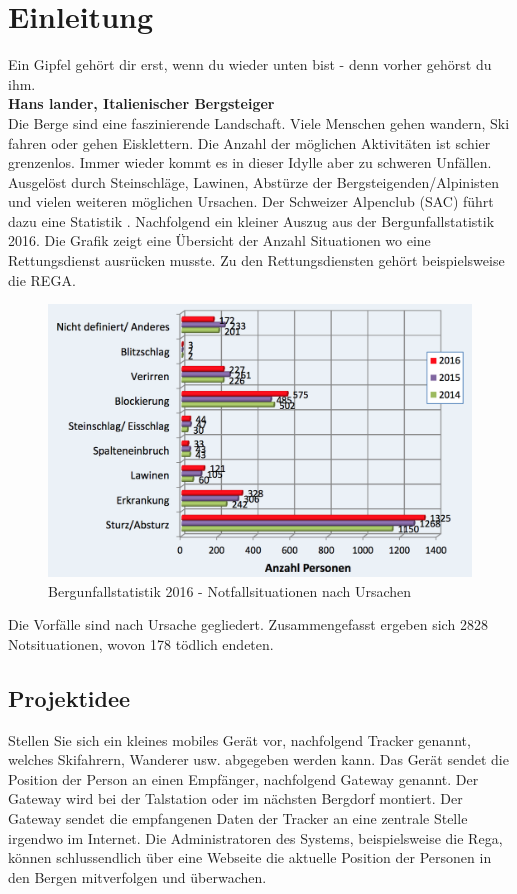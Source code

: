 \documentclass[11pt,english,german]{report}
\theoremstyle{definition}
\begin{document}
\chapter{Einleitung}
Ein Gipfel gehört dir erst, wenn du wieder unten bist - denn vorher gehörst du ihm.\\[0.3cm]
\textbf{Hans lander, Italienischer Bergsteiger\cite{kammerlander}} \\[0.5cm]
\noindent
Die Berge sind eine faszinierende Landschaft. Viele Menschen gehen wandern, Ski fahren oder gehen Eisklettern. Die Anzahl der möglichen Aktivitäten ist schier grenzenlos. Immer wieder kommt es in dieser Idylle aber zu schweren Unfällen. Ausgelöst durch Steinschläge, Lawinen, Abstürze der Bergsteigenden/Alpinisten und vielen weiteren möglichen Ursachen. Der Schweizer Alpenclub (SAC) führt dazu eine Statistik \cite{sacaccident}. Nachfolgend ein kleiner Auszug aus der Bergunfallstatistik 2016. Die Grafik zeigt eine Übersicht der Anzahl Situationen wo eine Rettungsdienst ausrücken musste. Zu den Rettungsdiensten gehört beispielsweise die REGA.\\
\begin{figure}[H]
	\centering
	\includegraphics[width=\textwidth]{img/sac_accidentstatistic_2016_reason.png}
	\caption[Bergunfallstatistik 2016 - Notfallsituationen nach Unrsachen]
	{Bergunfallstatistik 2016 - Notfallsituationen nach Ursachen}
\end{figure}
\noindent
Die Vorfälle sind nach Ursache gegliedert. Zusammengefasst ergeben sich 2828 Notsituationen, wovon 178 tödlich endeten.

\newpage
\section{Projektidee}
Stellen Sie sich ein kleines mobiles Gerät vor, nachfolgend Tracker genannt, welches Skifahrern, Wanderer usw. abgegeben werden kann. Das Gerät sendet die Position der Person an einen Empfänger, nachfolgend Gateway genannt. Der Gateway wird bei der Talstation oder im nächsten Bergdorf montiert. Der Gateway sendet die empfangenen Daten der Tracker an eine zentrale Stelle irgendwo im Internet. Die Administratoren des Systems, beispielsweise die Rega, können schlussendlich über eine Webseite die aktuelle Position der Personen in den Bergen mitverfolgen und überwachen.
\end{document}
